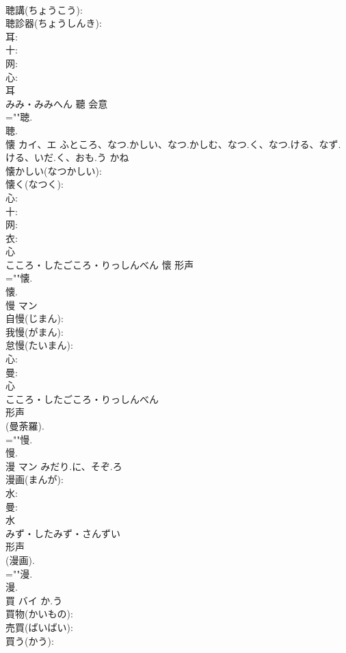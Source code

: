 \documentclass[8pt]{extreport}
\begin{document}
\begin{CJK}{UTF8}{min}
\\	聴講(ちょうこう): 
\\	聴診器(ちょうしんき): 
\\	耳: 
\\	十: 
\\	网: 
\\	心: 
\\	耳	
\\	みみ・みみへん	聽	会意 
\\	=""聴.
\\	聴.
\\	懐	カイ、エ	ふところ、なつ.かしい、なつ.かしむ、なつ.く、なつ.ける、なず.ける、いだ.く、おも.う	かね	
\\	懐かしい(なつかしい): 
\\	懐く(なつく): 
\\	心: 
\\	十: 
\\	网: 
\\	衣: 
\\	心	
\\	こころ・したごころ・りっしんべん	懷	形声 
\\	=""懐.
\\	懐.
\\	慢	マン			
\\	自慢(じまん): 
\\	我慢(がまん): 
\\	怠慢(たいまん): 
\\	心: 
\\	曼: 
\\	心	
\\	こころ・したごころ・りっしんべん	
\\	形声 
\\	(曼荼羅). 
\\	=""慢.
\\	慢.
\\	漫	マン	みだり.に、そぞ.ろ		
\\	漫画(まんが): 
\\	水: 
\\	曼: 
\\	水	
\\	みず・したみず・さんずい	
\\	形声 
\\	(漫画). 
\\	=""漫.
\\	漫.
\\	買	バイ	か.う		
\\	買物(かいもの): 
\\	売買(ばいばい): 
\\	買う(かう): 

\end{CJK}
\end{document}
